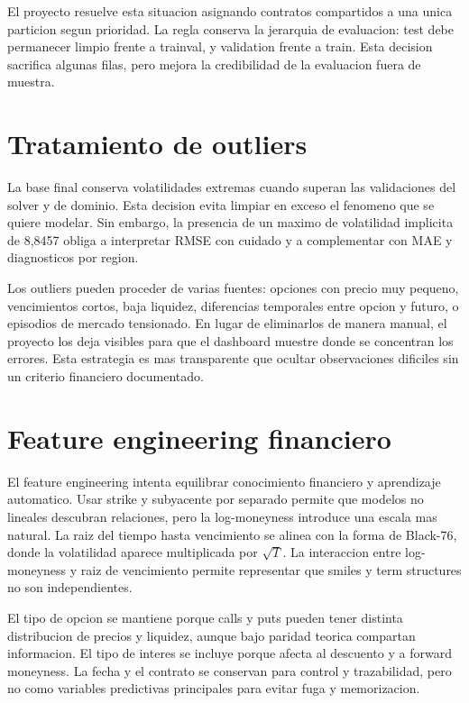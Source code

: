 El proyecto resuelve esta situacion asignando contratos compartidos a una unica particion segun prioridad. La regla conserva la jerarquia de evaluacion: test debe permanecer limpio frente a trainval, y validation frente a train. Esta decision sacrifica algunas filas, pero mejora la credibilidad de la evaluacion fuera de muestra.

\section{Tratamiento de outliers}

La base final conserva volatilidades extremas cuando superan las validaciones del solver y de dominio. Esta decision evita limpiar en exceso el fenomeno que se quiere modelar. Sin embargo, la presencia de un maximo de volatilidad implicita de 8,8457 obliga a interpretar RMSE con cuidado y a complementar con MAE y diagnosticos por region.

Los outliers pueden proceder de varias fuentes: opciones con precio muy pequeno, vencimientos cortos, baja liquidez, diferencias temporales entre opcion y futuro, o episodios de mercado tensionado. En lugar de eliminarlos de manera manual, el proyecto los deja visibles para que el dashboard muestre donde se concentran los errores. Esta estrategia es mas transparente que ocultar observaciones dificiles sin un criterio financiero documentado.

\section{Feature engineering financiero}

El feature engineering intenta equilibrar conocimiento financiero y aprendizaje automatico. Usar strike y subyacente por separado permite que modelos no lineales descubran relaciones, pero la log-moneyness introduce una escala mas natural. La raiz del tiempo hasta vencimiento se alinea con la forma de Black-76, donde la volatilidad aparece multiplicada por $\sqrt{T}$. La interaccion entre log-moneyness y raiz de vencimiento permite representar que smiles y term structures no son independientes.

El tipo de opcion se mantiene porque calls y puts pueden tener distinta distribucion de precios y liquidez, aunque bajo paridad teorica compartan informacion. El tipo de interes se incluye porque afecta al descuento y a forward moneyness. La fecha y el contrato se conservan para control y trazabilidad, pero no como variables predictivas principales para evitar fuga y memorizacion.

